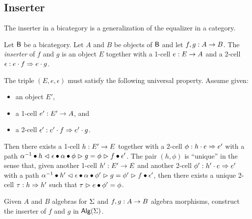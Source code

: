 \subsection{Inserter}

The inserter in a bicategory is a generalization of the equalizer in
a category.

\begin{definition}
Let $\B$ be a bicategory. Let $A$ and $B$ be objects of $\B$ and let
$f,g : A \onecell B$. The \emph{inserter} of $f$ and $g$ is an
object $E$ together with a 1-cell $e : E \onecell A$ and a 2-cell
$\epsilon : e \cdot f\twocell e \cdot g$.

The triple $(E,e,\epsilon)$ must satisfy the following universal
property. Assume given:
\begin{itemize}
\item an object $E'$,
\item a 1-cell $e' : E' \onecell A$, and
\item a 2-cell $\epsilon' : e' \cdot f \twocell e' \cdot g$.
\end{itemize}
Then there exists a 1-cell $h : E' \onecell E$ together with a 2-cell
$\phi : h \cdot e \twocell e'$ with a path $\rassoc{h}{e}{f} \vcomp
h \whiskerl \epsilon \vcomp \lassoc{h}{e}{g} \vcomp \phi \whiskerr g
= \phi \whiskerr f \vcomp \epsilon'$.
The pair $(h,\phi)$ is ``unique'' in the sense that,
given another 1-cell $h' : E' \onecell E$ and another 2-cell $\phi' :
h' \cdot e \twocell e'$ with a path $\rassoc{h'}{e}{f} \vcomp
h' \whiskerl \epsilon \vcomp \lassoc{h'}{e}{g} \vcomp \phi' \whiskerr g
= \phi' \whiskerr f \vcomp \epsilon'$, then there exists a unique 2-cell $\tau : h
\twocell h'$ such that $\tau \whiskerr e \vcomp \phi' = \phi$.
\end{definition}

\begin{problem}
\label{prob:inserter}
Given $A$ and $B$ algebras for $\sign$ and $f,g : A \onecell B$
algebra morphisms, construct the inserter of $f$ and $g$ in $\alg(\sign)$.
\end{problem}


